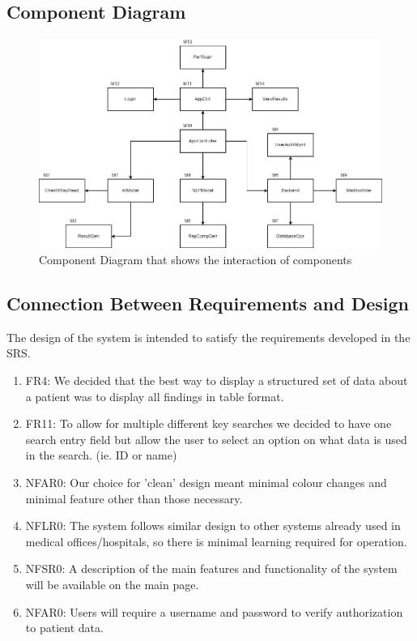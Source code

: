 \documentclass[12pt, titlepage]{article}
\begin{document}
\subsection{Component Diagram}
\begin{figure}[H]
    \centering
    \includegraphics[scale=0.55]{UsesHierarchy.png}
    \caption{Component Diagram that shows the interaction of components}
    \label{fig:componentDiagram}
\end{figure}

\subsection{Connection Between Requirements and Design} \label{SecConnection}
The design of the system is intended to satisfy the requirements developed in
the SRS. 
\begin{enumerate}
    \item FR4: We decided that the best way to display a structured set of data about a patient was to display all findings in table format.
    \item FR11: To allow for multiple different key searches we decided to have one search entry field but allow the user to select an option on what data is used in the search. (ie. ID or name) 
    \item NFAR0: Our choice for 'clean' design meant minimal colour changes and minimal feature other than those necessary. 
    \item NFLR0: The system follows similar design to other systems already used in medical offices/hospitals, so there is minimal learning required for operation. 
    \item NFSR0: A description of the main features and functionality of the system will be available on the main page.
    \item NFAR0: Users will require a username and password to verify authorization to patient data. 
\end{enumerate}
\end{document}
